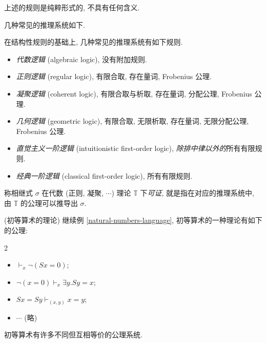 \begin{remark}
	{}
	上述的规则是纯粹形式的, 不具有任何含义.
\end{remark}

几种常见的推理系统如下.

\begin{definition}
	{}
	在结构性规则的基础上, 几种常见的推理系统有如下规则.
	\begin{itemize}
		\item \emph{代数逻辑} (algebraic logic), 没有附加规则.
		\item \emph{正则逻辑} (regular logic), 有限合取, 存在量词, Frobenius 公理.
		\item \emph{凝聚逻辑} (coherent logic), 有限合取与析取, 存在量词, 分配公理, Frobenius 公理.
		\item \emph{几何逻辑} (geometric logic), 有限合取, 无限析取, 存在量词, 无限分配公理, Frobenius 公理.
		\item \emph{直觉主义一阶逻辑} (intuitionistic first-order logic), \emph{除排中律以外的}所有有限规则.
		\item \emph{经典一阶逻辑} (classical first-order logic), 所有有限规则.
	\end{itemize}
\end{definition}

\begin{definition}
	{}
	称相继式 $\sigma$ 在代数 (正则, 凝聚, $\cdots$) 理论 $\mathbb T$ 下\emph{可证},
	就是指在对应的推理系统中, 由 $\mathbb T$ 的公理可以推导出 $\sigma$.
\end{definition}

\begin{example}
	{(初等算术的理论)}
	继续例 \ref{natural-numbers-language}, 初等算术的一种理论有如下的公理:
	\begin{multicols*}
		{2}
		\begin{itemize}
			\item $\vdash_x \neg (Sx=0)$;
			\item $\neg(x=0) \vdash_{x} \exists y. Sy=x$;
			\item $Sx=Sy\vdash_{(x,y)} x=y$;
			\item $\cdots$ (略)
		\end{itemize}
	\end{multicols*}
	
	初等算术有许多不同但互相等价的公理系统.
\end{example}

